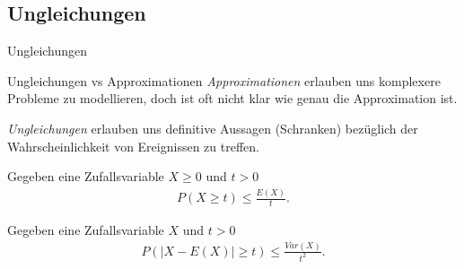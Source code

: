 \documentclass{beamer}
\begin{document}
\subsection{Ungleichungen}
\begin{frame}{Ungleichungen}
    \begin{block}{Ungleichungen vs Approximationen}
        \textit{Approximationen} erlauben uns komplexere Probleme zu modellieren, doch ist oft nicht klar wie genau die Approximation ist.\par\pause
        \textit{Ungleichungen} erlauben uns definitive Aussagen (Schranken) bezüglich der Wahrscheinlichkeit von Ereignissen zu treffen.
    \end{block}
\end{frame}

\begin{frame}
    \begin{definition}[Markov]
        Gegeben eine Zufallsvariable $X \geq 0$ und $t > 0$
        \begin{align*}
            P(X \geq t) \leq \frac{E(X)}{t}.
        \end{align*}
    \end{definition}\pause
    \begin{definition}[Chebyshev]
        Gegeben eine Zufallsvariable $X$ und $t > 0$
        \begin{align*}
            P(|X - E(X)| \geq t) \leq \frac{Var(X)}{t^2}.
        \end{align*}
    \end{definition}
\end{frame}
\end{document}
